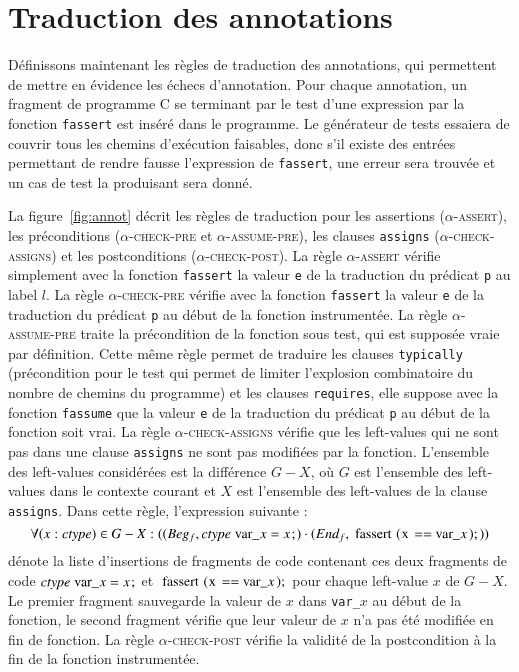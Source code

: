 \section{Traduction des annotations \eacsl}
\label{sec:annot}


Définissons maintenant les règles de traduction des
annotations, qui permettent de mettre en évidence les échecs d'annotation.
Pour chaque annotation, un fragment de programme C se terminant par le test
d'une expression par la fonction \lstinline'fassert' est inséré dans le
programme.
Le générateur de tests essaiera de couvrir tous les chemins d'exécution
faisables, donc s'il existe des entrées permettant de rendre fausse
l'expression de \lstinline'fassert', une erreur sera trouvée et un cas de test
la produisant sera donné.



La figure~\ref{fig:annot} décrit les règles de traduction pour les assertions
(\textsc{$\alpha$-assert}), les préconditions (\textsc{$\alpha$-check-pre} et
\textsc{$\alpha$-assume-pre}), les clauses \lstinline'assigns'
(\textsc{$\alpha$-check-assigns}) et les postconditions
(\textsc{$\alpha$-check-post}).
La règle \textsc{$\alpha$-assert} vérifie simplement avec la fonction
\lstinline'fassert' la valeur \lstinline'e' de la traduction du prédicat
\lstinline'p' au label $l$.
La règle \textsc{$\alpha$-check-pre} vérifie avec la fonction
\lstinline'fassert' la valeur \lstinline'e' de la traduction du prédicat
\lstinline'p' au début de la fonction instrumentée.
La règle \textsc{$\alpha$-assume-pre} traite la précondition de la fonction sous
test, qui est supposée vraie par définition.
Cette même règle permet de traduire les clauses \lstinline'typically'
(précondition pour le test qui permet de limiter l'explosion combinatoire du
nombre de chemins du programme) et les clauses \lstinline'requires', elle
suppose avec la fonction \lstinline'fassume' que la valeur \lstinline'e' de la
traduction du prédicat \lstinline'p' au début de la fonction soit vrai.
La règle \textsc{$\alpha$-check-assigns} vérifie que les left-values qui ne sont
pas dans une clause \lstinline'assigns' ne sont pas modifiées par la fonction.
L'ensemble des left-values considérées est la différence $G-X$, où $G$ est
l'ensemble des left-values dans le contexte courant et $X$ est l'ensemble des
left-values de la clause \lstinline'assigns'.
Dans cette règle, l'expression suivante :
\[
\forall (x:\mathit{ctype}) \in G-X :
((Beg_f, \mathit{ctype}~\mbox{\lstinline'var_'}x = x\semicolon)
\concat (End_f, \mbox{\lstinline'fassert(x == var_'}x\mbox{\lstinline');'}) )
\]
dénote la liste d'insertions de fragments de code contenant ces deux fragments
de code $\mathit{ctype}~\mbox{\lstinline'var_'}x = x\semicolon$ et
$\mbox{\lstinline'fassert(x == var_'}x\mbox{\lstinline');'}$ pour chaque
left-value $x$ de $G-X$.
Le premier fragment sauvegarde la valeur de $x$ dans \lstinline'var_'$x$ au
début de la fonction, le second fragment vérifie que leur valeur de $x$ n'a pas
été modifiée en fin de fonction.
La règle \textsc{$\alpha$-check-post} vérifie la validité de la postcondition
à la fin de la fonction instrumentée.

